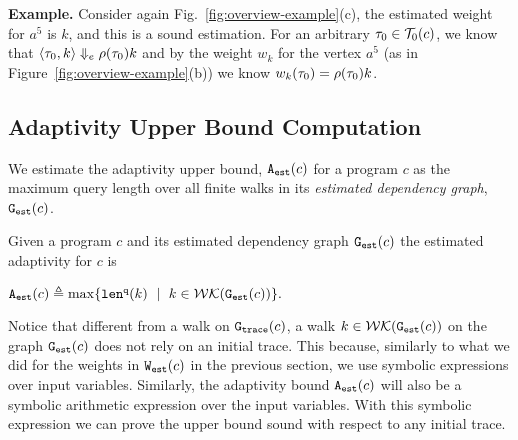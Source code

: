%
\textbf{Example.} 
Consider again
Fig.~\ref{fig:overview-example}(c),
the estimated weight for $a^5$ is $k$, and this is a sound estimation.
For an arbitrary $\mathtt{\tau}_0 \in \mathcal{T}_0(c)$, we know that $\langle \mathtt{\tau}_0, k \rangle \Downarrow_e \rho(\mathtt{\tau}_0) k$ and
by the weight $w_k$ for the vertex $a^5$ (as in Figure~\ref{fig:overview-example}(b)) we know 
$w_k(\mathtt{\tau}_0) = \rho(\mathtt{\tau}_0) k$. 
%
%
\subsection{Adaptivity Upper Bound Computation}
\label{sec:alg_adaptcompute}
We estimate the adaptivity upper bound, ${\mathtt{A_{est}}}(c)$ for a program $c$ as the maximum query length over all finite walks in its \emph{estimated dependency graph}, $\mathtt{{G_{est}}}({c})$.
%

\begin{defn}
\label{def:prog_adapt}
{
Given a program ${c}$ and its estimated dependency graph 
$\mathtt{{G_{est}}}({c})$
the estimated adaptivity for $c$ is 
\begin{center}
$
\progA({c})
\triangleq \max
\left\{ \qlen(k) \ \mid \  k \in \walks(\progG(c))\right \}.
$
\end{center}
}
\end{defn}



Notice that different from a walk on $\mathtt{{G_{trace}}}(c)$, a walk $k \in \mathcal{WK}(\mathtt{{G_{est}}}(c))$ on the graph $\mathtt{{G_{est}}}(c)$  does not rely on an initial trace. This because, similarly to what we did for the weights in $\mathtt{{W_{est}}}(c)$ in the previous section, we use symbolic expressions over input variables. Similarly, the adaptivity bound ${\mathtt{A_{est}}}(c)$ will also be a symbolic arithmetic expression over the input variables. With this symbolic expression we can prove the upper bound sound with respect to any initial trace. 

